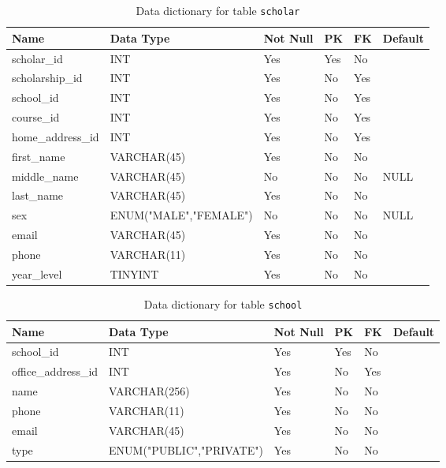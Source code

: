 \documentclass{article}
\newcommand{\tname}[1]{\color{blue}\texttt{#1}}
\begin{document}
\begin{table}[H]
    \centering
    \begin{tabularx}{\textwidth}{m{1.0in}Xllll}
        \hline
        Name              & Data Type             & Not Null & PK  & FK  & Default \\ \hline
        scholar\_id       & INT                   & Yes      & Yes & No  & ~       \\
        scholarship\_id   & INT                   & Yes      & No  & Yes & ~       \\
        school\_id        & INT                   & Yes      & No  & Yes & ~       \\
        course\_id        & INT                   & Yes      & No  & Yes & ~       \\
        home\_address\_id & INT                   & Yes      & No  & Yes & ~       \\
        first\_name       & VARCHAR(45)           & Yes      & No  & No  & ~       \\
        middle\_name      & VARCHAR(45)           & No       & No  & No  & NULL    \\
        last\_name        & VARCHAR(45)           & Yes      & No  & No  & ~       \\
        sex               & ENUM("MALE","FEMALE") & No       & No  & No  & NULL    \\
        email             & VARCHAR(45)           & Yes      & No  & No  & ~       \\
        phone             & VARCHAR(11)           & Yes      & No  & No  & ~       \\
        year\_level       & TINYINT               & Yes      & No  & No  & ~       \\
    \end{tabularx}
    \caption{Data dictionary for table \tname{scholar}}
\end{table}

\begin{table}[H]
    \centering
    \begin{tabularx}{\textwidth}{m{1.0in}Xllll}
        \hline
        Name                & Data Type                & Not Null & PK  & FK  & Default \\ \hline
        school\_id          & INT                      & Yes      & Yes & No  & ~       \\
        office\_address\_id & INT                      & Yes      & No  & Yes & ~       \\
        name                & VARCHAR(256)             & Yes      & No  & No  & ~       \\
        phone               & VARCHAR(11)              & Yes      & No  & No  & ~       \\
        email               & VARCHAR(45)              & Yes      & No  & No  & ~       \\
        type                & ENUM("PUBLIC","PRIVATE") & Yes      & No  & No  & ~       \\
    \end{tabularx}
    \caption{Data dictionary for table \tname{school}}
\end{table}
\end{document}
